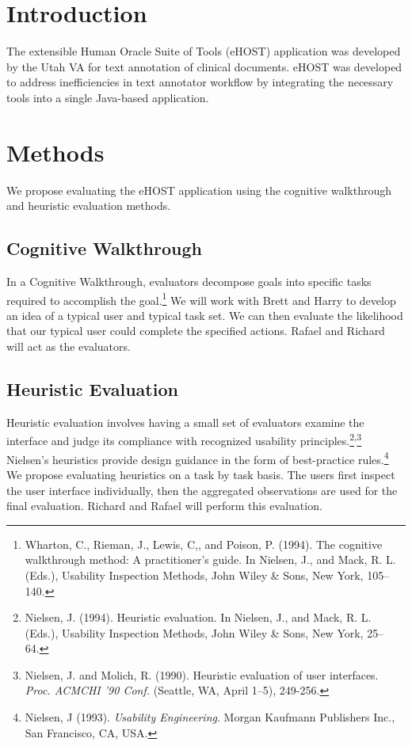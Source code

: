 \documentclass[11pt]{article}
\begin{document}
\section{Introduction}
The extensible Human Oracle Suite of Tools (eHOST) application was developed by the Utah VA for text annotation of clinical documents. eHOST was developed to address inefficiencies in text annotator workflow by integrating the necessary tools into a single Java-based application.

\section{Methods}

We propose evaluating the eHOST application using the cognitive walkthrough and heuristic evaluation methods.

\subsection{Cognitive Walkthrough}

In a Cognitive Walkthrough, evaluators decompose goals into specific tasks required to accomplish the goal.\footnote[1]{Wharton, C., Rieman, J., Lewis, C,, and Poison, P. (1994). The cognitive walkthrough method: A practitioner’s guide. In Nielsen, J., and Mack, R. L. (Eds.), Usability Inspection Methods, John Wiley \& Sons, New York, 105--140.} We will work with Brett and Harry to develop an idea of a typical user and typical task set. We can then evaluate the likelihood that our typical user could complete the specified actions. Rafael and Richard will act as the evaluators.

\subsection{Heuristic Evaluation}

Heuristic evaluation involves having a small set of evaluators examine the interface and judge its compliance with recognized usability principles.\footnote[2]{Nielsen, J. (1994). Heuristic evaluation. In Nielsen, J., and Mack, R. L. (Eds.), Usability Inspection Methods, John Wiley \& Sons, New York, 25--64.}\textsuperscript{,}\footnote[3]{Nielsen, J. and Molich, R. (1990). Heuristic evaluation of user interfaces. \textit{Proc. ACMCHI '90 Conf.} (Seattle, WA, April 1--5), 249-256.} Nielsen's heuristics provide design guidance in the form of best-practice rules.\footnote[4]{Nielsen, J (1993). \textit{Usability Engineering}. Morgan Kaufmann Publishers Inc., San Francisco, CA, USA.} We propose evaluating heuristics on a task by task basis. The users first inspect the user interface individually, then the aggregated observations are used for the final evaluation. Richard and Rafael will perform this evaluation. 
\end{document}

